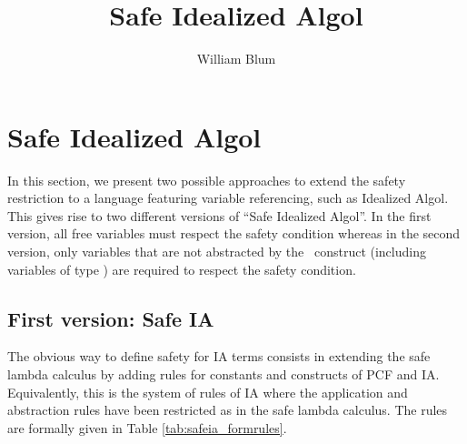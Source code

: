 



\author{William Blum}
\title{Safe Idealized Algol}


\maketitle

\section{Safe Idealized Algol}

In this section, we present two possible approaches to extend the
safety restriction to a language featuring variable referencing,
such as Idealized Algol. This gives rise to two different versions
of ``Safe Idealized Algol''. In the first version, all free
variables must respect the safety condition whereas in the second
version, only variables that are not abstracted by the \ianew\
construct (including variables of type \iavar) are required to
respect the safety condition.


\subsection{First version: Safe IA}

 The obvious way to define safety for IA terms consists in extending the safe lambda calculus by adding rules
 for constants and constructs of PCF and IA.
 Equivalently, this is the system of rules of IA where the application and abstraction rules
 have been restricted as in the safe lambda calculus.
The rules are formally given in Table \ref{tab:safeia_formrules}.




